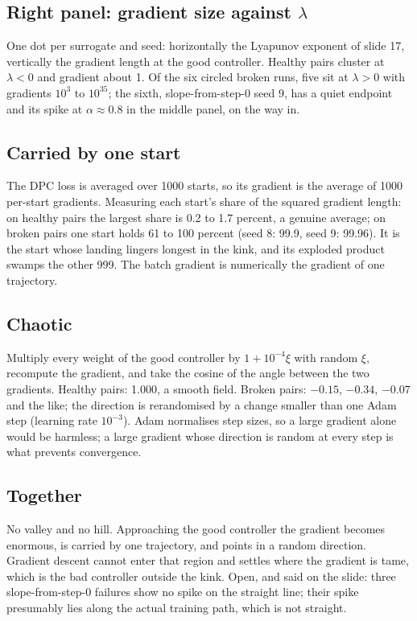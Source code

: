 \documentclass[11pt]{article}
\begin{document}
\subsection{Right panel: gradient size against $\lambda$}
One dot per surrogate and seed: horizontally the Lyapunov exponent of slide 17, vertically the gradient length at the good controller. Healthy pairs cluster at $\lambda<0$ and gradient about 1. Of the six circled broken runs, five sit at $\lambda>0$ with gradients $10^3$ to $10^{35}$; the sixth, slope-from-step-0 seed 9, has a quiet endpoint and its spike at $\alpha\approx0.8$ in the middle panel, on the way in.

\subsection{Carried by one start}
The DPC loss is averaged over 1000 starts, so its gradient is the average of 1000 per-start gradients. Measuring each start's share of the squared gradient length: on healthy pairs the largest share is 0.2 to 1.7 percent, a genuine average; on broken pairs one start holds 61 to 100 percent (seed 8: 99.9, seed 9: 99.96). It is the start whose landing lingers longest in the kink, and its exploded product swamps the other 999. The batch gradient is numerically the gradient of one trajectory.

\subsection{Chaotic}
Multiply every weight of the good controller by $1+10^{-4}\xi$ with random $\xi$, recompute the gradient, and take the cosine of the angle between the two gradients. Healthy pairs: 1.000, a smooth field. Broken pairs: $-0.15$, $-0.34$, $-0.07$ and the like; the direction is rerandomised by a change smaller than one Adam step (learning rate $10^{-3}$). Adam normalises step sizes, so a large gradient alone would be harmless; a large gradient whose direction is random at every step is what prevents convergence.

\subsection{Together}
No valley and no hill. Approaching the good controller the gradient becomes enormous, is carried by one trajectory, and points in a random direction. Gradient descent cannot enter that region and settles where the gradient is tame, which is the bad controller outside the kink. Open, and said on the slide: three slope-from-step-0 failures show no spike on the straight line; their spike presumably lies along the actual training path, which is not straight.
\end{document}
